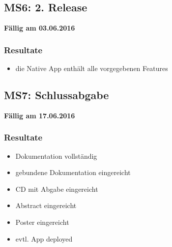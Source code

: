 \subsection{MS6: 2. Release}
\label{pm-ms6}
\textbf{Fällig am 03.06.2016}
\subsubsection{Resultate}
\begin{itemize}
	\item die Native App enthält alle vorgegebenen Features
\end{itemize}

\subsection{MS7: Schlussabgabe}
\label{pm-ms7}
\textbf{Fällig am 17.06.2016}
\subsubsection{Resultate}
\begin{itemize}
	\item Dokumentation vollständig
	\item gebundene Dokumentation eingereicht
	\item CD mit Abgabe eingereicht
	\item Abstract eingereicht
	\item Poster eingereicht
	\item evtl. App deployed
\end{itemize}